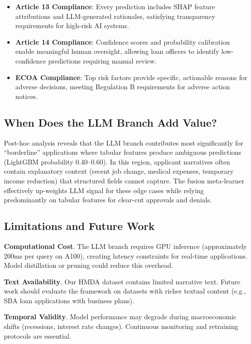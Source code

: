 \documentclass[11pt,a4paper]{article}
\begin{document}
\begin{itemize}
    \item \textbf{Article 13 Compliance}: Every prediction includes SHAP feature attributions and LLM-generated rationales, satisfying transparency requirements for high-risk AI systems.
    \item \textbf{Article 14 Compliance}: Confidence scores and probability calibration enable meaningful human oversight, allowing loan officers to identify low-confidence predictions requiring manual review.
    \item \textbf{ECOA Compliance}: Top risk factors provide specific, actionable reasons for adverse decisions, meeting Regulation B requirements for adverse action notices.
\end{itemize}

\subsection{When Does the LLM Branch Add Value?}

Post-hoc analysis reveals that the LLM branch contributes most significantly for ``borderline'' applications where tabular features produce ambiguous predictions (LightGBM probability 0.40--0.60). In this region, applicant narratives often contain explanatory context (recent job change, medical expenses, temporary income reduction) that structured fields cannot capture. The fusion meta-learner effectively up-weights LLM signal for these edge cases while relying predominantly on tabular features for clear-cut approvals and denials.

\subsection{Limitations and Future Work}

\textbf{Computational Cost}. The LLM branch requires GPU inference (approximately 200ms per query on A100), creating latency constraints for real-time applications. Model distillation or pruning could reduce this overhead.

\textbf{Text Availability}. Our HMDA dataset contains limited narrative text. Future work should evaluate the framework on datasets with richer textual content (e.g., SBA loan applications with business plans).

\textbf{Temporal Validity}. Model performance may degrade during macroeconomic shifts (recessions, interest rate changes). Continuous monitoring and retraining protocols are essential.
\end{document}
